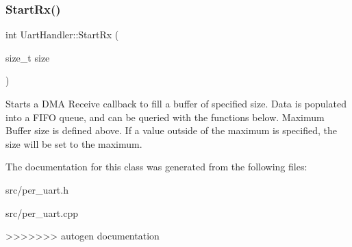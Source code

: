 \subsubsection{\texorpdfstring{Start\+Rx()}{StartRx()}}
{\footnotesize\ttfamily int Uart\+Handler\+::\+Start\+Rx (\begin{DoxyParamCaption}\item[{size\+\_\+t}]{size }\end{DoxyParamCaption})}

Starts a D\+MA Receive callback to fill a buffer of specified size. Data is populated into a F\+I\+FO queue, and can be queried with the functions below. Maximum Buffer size is defined above. If a value outside of the maximum is specified, the size will be set to the maximum. 

The documentation for this class was generated from the following files\+:\begin{DoxyCompactItemize}
\item 
src/per\+\_\+uart.\+h\item 
src/per\+\_\+uart.\+cpp\end{DoxyCompactItemize}
>>>>>>> autogen documentation
